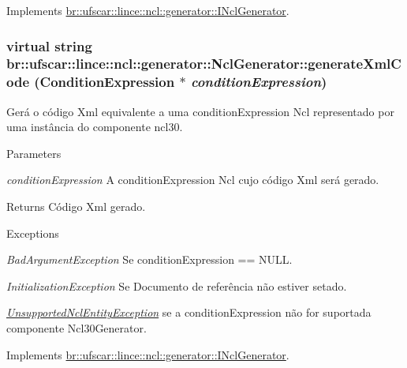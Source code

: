 Implements \hyperlink{classbr_1_1ufscar_1_1lince_1_1ncl_1_1generator_1_1INclGenerator_ab868d963b3ca0de3cfc108939731475f}{br::ufscar::lince::ncl::generator::INclGenerator}.

\hypertarget{classbr_1_1ufscar_1_1lince_1_1ncl_1_1generator_1_1NclGenerator_a1c0a01534324eb9c5614b72391844cd5}{
\subsubsection[{generateXmlCode}]{\setlength{\rightskip}{0pt plus 5cm}virtual string br::ufscar::lince::ncl::generator::NclGenerator::generateXmlCode (ConditionExpression $\ast$ {\em conditionExpression})}}
\label{classbr_1_1ufscar_1_1lince_1_1ncl_1_1generator_1_1NclGenerator_a1c0a01534324eb9c5614b72391844cd5}


Gerá o código Xml equivalente a uma conditionExpression Ncl representado por uma instância do componente ncl30. 


\begin{DoxyParams}{Parameters}
\item[{\em conditionExpression}]A conditionExpression Ncl cujo código Xml será gerado. \end{DoxyParams}
\begin{DoxyReturn}{Returns}
Código Xml gerado. 
\end{DoxyReturn}

\begin{DoxyExceptions}{Exceptions}
\item[{\em BadArgumentException}]Se conditionExpression == NULL. \item[{\em InitializationException}]Se Documento de referência não estiver setado. \item[{\em \hyperlink{classbr_1_1ufscar_1_1lince_1_1ncl_1_1generator_1_1UnsupportedNclEntityException}{UnsupportedNclEntityException}}]se a conditionExpression não for suportada componente Ncl30Generator. \end{DoxyExceptions}


Implements \hyperlink{classbr_1_1ufscar_1_1lince_1_1ncl_1_1generator_1_1INclGenerator_aa03215531edbb0cc50097b2f6de3eda9}{br::ufscar::lince::ncl::generator::INclGenerator}.

